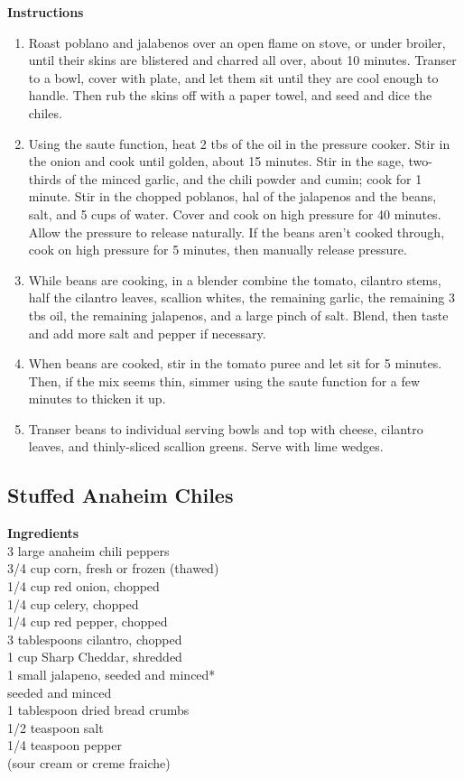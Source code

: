 \documentclass{article}
\numberwithin{figure}{section}
\numberwithin{equation}{section}
\begin{document}
{\bf Instructions}
\begin{enumerate}
\item Roast poblano and jalabenos over an open flame on stove, or under broiler, until their skins are blistered and charred all over, about 10 minutes. Transer to a bowl, cover with plate, and let them sit until they are cool enough to handle. Then rub the skins off with a paper towel, and seed and dice the chiles.
\item Using the saute function, heat 2 tbs of the oil in the pressure cooker. Stir in the onion and cook until golden, about 15 minutes. Stir in the sage, two-thirds of the minced garlic, and the chili powder and cumin; cook for 1 minute. Stir in the chopped poblanos, hal of the jalapenos and the beans, salt, and 5 cups of water. Cover and cook on high pressure for 40 minutes. Allow the pressure to release naturally. If the beans aren't cooked through, cook on high pressure for 5 minutes, then manually release pressure.
\item While beans are cooking, in a blender combine the tomato, cilantro stems, half the cilantro leaves, scallion whites, the remaining garlic, the remaining 3 tbs oil, the remaining jalapenos, and a large pinch of salt. Blend, then taste and add more salt and pepper if necessary.
\item When beans are cooked, stir in the tomato puree and let sit for 5 minutes. Then, if the mix seems thin, simmer using the saute function for a few minutes to thicken it up.
\item Transer beans to individual serving bowls and top with cheese, cilantro leaves, and thinly-sliced scallion greens. Serve with lime wedges.
\end{enumerate}

\pagebreak
\subsection{Stuffed Anaheim Chiles}
{\bf Ingredients}\\
3 large anaheim chili peppers\\
3/4 cup corn, fresh or frozen (thawed)\\
1/4 cup red onion, chopped\\
1/4 cup celery, chopped\\
1/4 cup red pepper, chopped\\
3 tablespoons cilantro, chopped\\
1 cup Sharp Cheddar, shredded\\
1 small jalapeno, seeded and minced*\\
seeded and minced\\
1 tablespoon dried bread crumbs\\
1/2 teaspoon salt\\
1/4 teaspoon pepper\\
(sour cream or creme fraiche)\\
\end{document}
